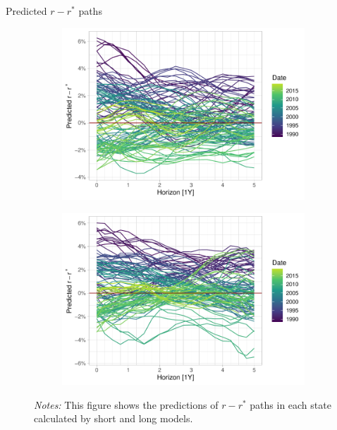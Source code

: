 \documentclass[10pt,aspectratio=169]{beamer}
\begin{document}
\begin{frame}{Predicted $r-r^*$ paths}
    \begin{figure}[!htbp]\centering
        \begin{minipage}{\textwidth}
            \caption{}
            \label{fig:predicted_paths}
            \begin{subfigure}[b]{0.49\textwidth}
                \includegraphics[width=\linewidth]{predicted_paths_short.pdf}
            \end{subfigure}%
            \begin{subfigure}[b]{0.49\textwidth}
          \includegraphics[width=\linewidth]{predicted_paths_long.pdf}
        \end{subfigure}
          {\begin{flushleft}\tiny \textit{Notes:} This figure shows the predictions of $r-r^*$ paths in each state calculated by short and long models.\end{flushleft}} 
          \end{minipage}
      \end{figure}
\end{frame}
\end{document}
